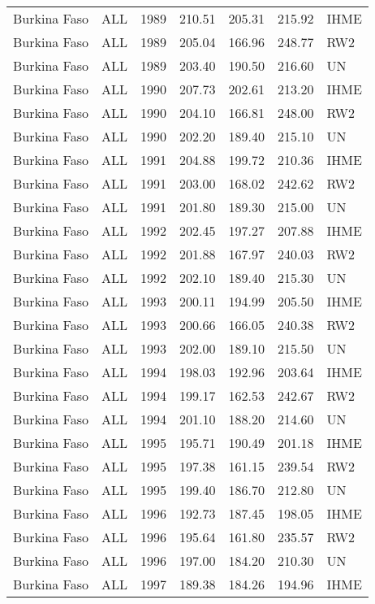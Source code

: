 \begin{longtable}{lllrrrl}
  Burkina Faso & ALL & 1989 & 210.51 & 205.31 & 215.92 & IHME \\ 
  Burkina Faso & ALL & 1989 & 205.04 & 166.96 & 248.77 & RW2 \\ 
  Burkina Faso & ALL & 1989 & 203.40 & 190.50 & 216.60 & UN \\ 
  Burkina Faso & ALL & 1990 & 207.73 & 202.61 & 213.20 & IHME \\ 
  Burkina Faso & ALL & 1990 & 204.10 & 166.81 & 248.00 & RW2 \\ 
  Burkina Faso & ALL & 1990 & 202.20 & 189.40 & 215.10 & UN \\ 
  Burkina Faso & ALL & 1991 & 204.88 & 199.72 & 210.36 & IHME \\ 
  Burkina Faso & ALL & 1991 & 203.00 & 168.02 & 242.62 & RW2 \\ 
  Burkina Faso & ALL & 1991 & 201.80 & 189.30 & 215.00 & UN \\ 
  Burkina Faso & ALL & 1992 & 202.45 & 197.27 & 207.88 & IHME \\ 
  Burkina Faso & ALL & 1992 & 201.88 & 167.97 & 240.03 & RW2 \\ 
  Burkina Faso & ALL & 1992 & 202.10 & 189.40 & 215.30 & UN \\ 
  Burkina Faso & ALL & 1993 & 200.11 & 194.99 & 205.50 & IHME \\ 
  Burkina Faso & ALL & 1993 & 200.66 & 166.05 & 240.38 & RW2 \\ 
  Burkina Faso & ALL & 1993 & 202.00 & 189.10 & 215.50 & UN \\ 
  Burkina Faso & ALL & 1994 & 198.03 & 192.96 & 203.64 & IHME \\ 
  Burkina Faso & ALL & 1994 & 199.17 & 162.53 & 242.67 & RW2 \\ 
  Burkina Faso & ALL & 1994 & 201.10 & 188.20 & 214.60 & UN \\ 
  Burkina Faso & ALL & 1995 & 195.71 & 190.49 & 201.18 & IHME \\ 
  Burkina Faso & ALL & 1995 & 197.38 & 161.15 & 239.54 & RW2 \\ 
  Burkina Faso & ALL & 1995 & 199.40 & 186.70 & 212.80 & UN \\ 
  Burkina Faso & ALL & 1996 & 192.73 & 187.45 & 198.05 & IHME \\ 
  Burkina Faso & ALL & 1996 & 195.64 & 161.80 & 235.57 & RW2 \\ 
  Burkina Faso & ALL & 1996 & 197.00 & 184.20 & 210.30 & UN \\ 
  Burkina Faso & ALL & 1997 & 189.38 & 184.26 & 194.96 & IHME \\ 

\end{longtable}
